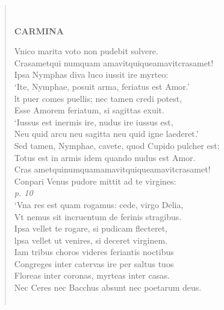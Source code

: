 \documentclass[11pt, a4paper]{report}
\begin{document}
\begin{verse}
        ﻿\pagebreak 
     \marginpar{[172]} \begin{center} \textbf{CARMINA} \end{center}Vnico marita voto non pudebit solvere. \\ Crasametqui numquam amavitquiqueamavitcrasamet! \\ Ipsa Nymphas diva luco iussit ire myrteo: \\ ‘Ite, Nymphae, posuit arma, feriatus est Amor.’ \\ lt puer comes puellis; nec tamen credi potest, \\ Esse Amorem feriatum, si sagittas exuit. \\ ‘Iussus est inermis ire, nudus ire iussus est, \\ Neu quid arcu neu sagitta neu quid igne laederet.’ \\ Sed tamen, Nymphae, cavete, quod Cupido pulcher est: \\ Totus est in armis idem quando nudus est Amor. \\ Cras ametquinumquamamavitquiqueamavitcrasamet! \\ Conpari Venus pudore mittit ad te virgines: \\ \textit{p. 10} \\ ‘Vna res est quam rogamus: cede, virgo Delia, \\ Vt nemus sit incruentum de ferinis stragibus. \\ Ipsa vellet te rogare, si pudicam flecteret, \\ lpsa vellet ut venires, si deceret virginem. \\ Iam tribus choros videres feriantis noctibus \\ Congreges inter catervas ire per saltus tuos \\ Floreas inter coronas, myrteas inter casas. \\ Nec Ceres nec Bacchus absunt nec poetarum deus. \\ 
        ﻿\pagebreak 

\end{verse}
\end{document}
